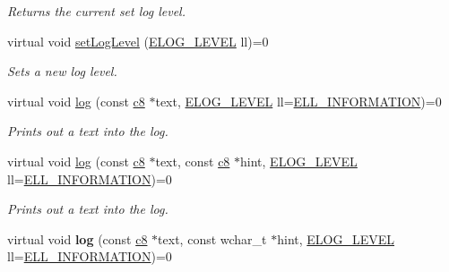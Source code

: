 \begin{DoxyCompactItemize}
\begin{DoxyCompactList}\small\item\em Returns the current set log level. \end{DoxyCompactList}\item 
virtual void \hyperlink{classirr_1_1ILogger_a226a6f71f76970f2d846a10599f2e5ec}{set\+Log\+Level} (\hyperlink{namespaceirr_aa2d1cac68606a25ed24cfffccfa30a92}{E\+L\+O\+G\+\_\+\+L\+E\+V\+EL} ll)=0
\begin{DoxyCompactList}\small\item\em Sets a new log level. \end{DoxyCompactList}\item 
virtual void \hyperlink{classirr_1_1ILogger_acbbc214a06cd968409000f55aa76c82f}{log} (const \hyperlink{namespaceirr_a9395eaea339bcb546b319e9c96bf7410}{c8} $\ast$text, \hyperlink{namespaceirr_aa2d1cac68606a25ed24cfffccfa30a92}{E\+L\+O\+G\+\_\+\+L\+E\+V\+EL} ll=\hyperlink{namespaceirr_aa2d1cac68606a25ed24cfffccfa30a92a9d74de15737e326a91aec6f38c23f9cf}{E\+L\+L\+\_\+\+I\+N\+F\+O\+R\+M\+A\+T\+I\+ON})=0
\begin{DoxyCompactList}\small\item\em Prints out a text into the log. \end{DoxyCompactList}\item 
virtual void \hyperlink{classirr_1_1ILogger_afccb7b2bb0a9b0415204d63e2b0cf290}{log} (const \hyperlink{namespaceirr_a9395eaea339bcb546b319e9c96bf7410}{c8} $\ast$text, const \hyperlink{namespaceirr_a9395eaea339bcb546b319e9c96bf7410}{c8} $\ast$hint, \hyperlink{namespaceirr_aa2d1cac68606a25ed24cfffccfa30a92}{E\+L\+O\+G\+\_\+\+L\+E\+V\+EL} ll=\hyperlink{namespaceirr_aa2d1cac68606a25ed24cfffccfa30a92a9d74de15737e326a91aec6f38c23f9cf}{E\+L\+L\+\_\+\+I\+N\+F\+O\+R\+M\+A\+T\+I\+ON})=0
\begin{DoxyCompactList}\small\item\em Prints out a text into the log. \end{DoxyCompactList}\item 
virtual void {\bfseries log} (const \hyperlink{namespaceirr_a9395eaea339bcb546b319e9c96bf7410}{c8} $\ast$text, const wchar\+\_\+t $\ast$hint, \hyperlink{namespaceirr_aa2d1cac68606a25ed24cfffccfa30a92}{E\+L\+O\+G\+\_\+\+L\+E\+V\+EL} ll=\hyperlink{namespaceirr_aa2d1cac68606a25ed24cfffccfa30a92a9d74de15737e326a91aec6f38c23f9cf}{E\+L\+L\+\_\+\+I\+N\+F\+O\+R\+M\+A\+T\+I\+ON})=0\hypertarget{classirr_1_1ILogger_afbdfdab8e53d060e08d7847f8ca77b4a}{}\label{classirr_1_1ILogger_afbdfdab8e53d060e08d7847f8ca77b4a}


\end{DoxyCompactItemize}
